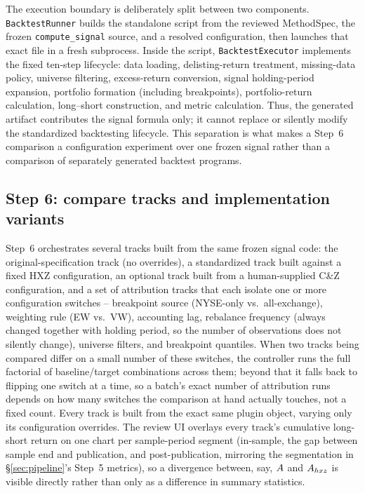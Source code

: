The execution boundary is deliberately split between two components.
\texttt{BacktestRunner} builds the standalone script from the reviewed
MethodSpec, the frozen \texttt{compute\_signal} source, and a resolved
configuration, then launches that exact file in a fresh subprocess.
Inside the script, \texttt{BacktestExecutor} implements the fixed ten-step
lifecycle: data loading, delisting-return treatment, missing-data policy,
universe filtering, excess-return conversion, signal holding-period
expansion, portfolio formation (including breakpoints), portfolio-return
calculation, long--short construction, and metric calculation. Thus, the
generated artifact contributes the signal formula only; it cannot replace or
silently modify the standardized backtesting lifecycle. This separation is
what makes a Step~6 comparison a configuration experiment over one frozen
signal rather than a comparison of separately generated backtest programs.

\subsection{Step 6: compare tracks and implementation variants}

Step~6 orchestrates several tracks built from the same frozen signal code:
the original-specification track (no overrides), a standardized track built
against a fixed HXZ configuration, an optional track built from a
human-supplied C\&Z configuration, and a set of attribution tracks that each
isolate one or more configuration switches -- breakpoint source (NYSE-only
vs.\ all-exchange), weighting rule (EW vs.\ VW), accounting lag, rebalance
frequency (always changed together with holding period, so the number of
observations does not silently change), universe filters, and breakpoint
quantiles. When two tracks being compared differ on a small number of these
switches, the controller runs the full factorial of baseline/target
combinations across them; beyond that it falls back to flipping one switch
at a time, so a batch's exact number of attribution runs depends on how many
switches the comparison at hand actually touches, not a fixed count.
Every track is built from the exact same plugin object, varying only its
configuration overrides. The review UI overlays every track's cumulative
long-short return on one chart per sample-period segment (in-sample, the gap
between sample end and publication, and post-publication, mirroring the
segmentation in \S\ref{sec:pipeline}'s Step~5 metrics), so a divergence
between, say, $A$ and $A_{hxz}$ is visible directly rather than only as a
difference in summary statistics.

